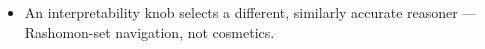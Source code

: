 \begin{itemize}
    \item An interpretability knob selects a different, similarly accurate reasoner — Rashomon-set navigation, not cosmetics. 

\end{itemize}
